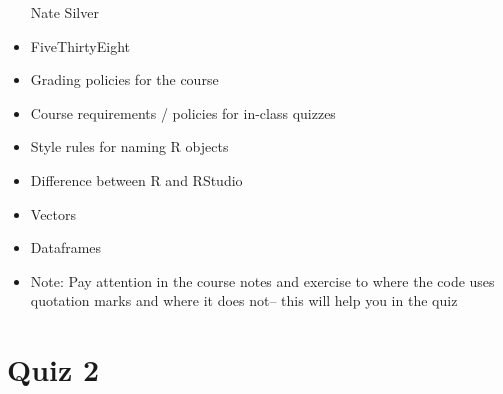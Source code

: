 \documentclass[]{book}
\theoremstyle{definition}
\theoremstyle{definition}
\theoremstyle{definition}
\theoremstyle{remark}
\begin{document}
\begin{itemize}
  Nate Silver
\item
  FiveThirtyEight
\item
  Grading policies for the course
\item
  Course requirements / policies for in-class quizzes
\item
  Style rules for naming R objects
\item
  Difference between R and RStudio
\item
  Vectors
\item
  Dataframes
\item
  Note: Pay attention in the course notes and exercise to where the code
  uses quotation marks and where it does not-- this will help you in the
  quiz
\end{itemize}

\section{Quiz 2}\label{quiz-2}
\end{document}
